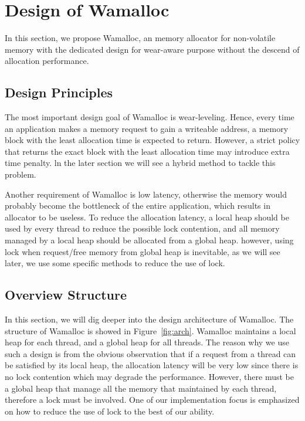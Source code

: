 \documentclass{vldb}
\begin{document}
\section{Design of Wamalloc}

In this section, we propose Wamalloc, an memory allocator for non-volatile memory with the dedicated design for wear-aware purpose without the descend of allocation performance.

\subsection{Design Principles}

The most important design goal of Wamalloc is wear-leveling. 
Hence, every time an application makes a memory request to gain a writeable address, 
a memory block with the least allocation time is expected to return.
However, a strict policy that returns the exact block with the least allocation time may introduce extra time penalty.
ln the later section we will see a hybrid method to tackle this problem.

Another requirement of Wamalloc is low latency,
otherwise the memory would probably become the bottleneck of the entire application,
which results in allocator to be useless. 
To reduce the allocation latency, a local heap should be used by every thread to reduce the possible lock contention,
and all memory managed by a local heap should be allocated from a global heap.
however, using lock when request/free memory from global heap is inevitable,
as we will see later, we use some specific methods to reduce the use of lock.

\subsection{Overview Structure}

In this section, we will dig deeper into the design architecture of Wamalloc.
The structure of Wamalloc is showed in Figure~\ref{fig:arch}.
Wamalloc maintains a local heap for each thread, and a global heap for all threads.
The reason why we use such a design is from the obvious observation that if a request from a thread can be satisfied by its local heap,
the allocation latency will be very low since there is no lock contention which may degrade the performance.
However, there must be a global heap that manage all the memory that maintained by each thread,
therefore a lock must be involved. One of our implementation focus is emphasized on how to reduce the use of lock to the best of our ability.
\end{document}
